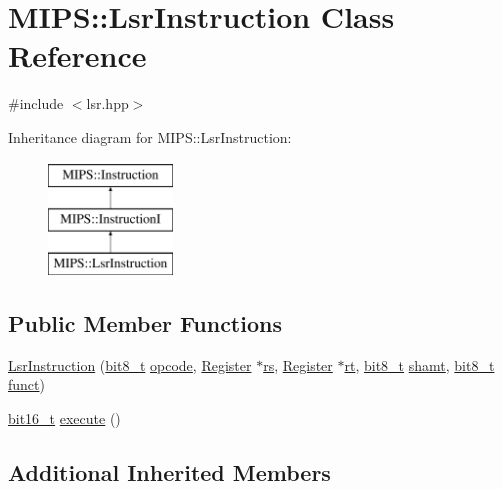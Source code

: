 \hypertarget{classMIPS_1_1LsrInstruction}{}\section{M\+I\+PS\+:\+:Lsr\+Instruction Class Reference}
\label{classMIPS_1_1LsrInstruction}


{\ttfamily \#include $<$lsr.\+hpp$>$}

Inheritance diagram for M\+I\+PS\+:\+:Lsr\+Instruction\+:\begin{figure}[H]
\begin{center}
\leavevmode
\includegraphics[height=3.000000cm]{classMIPS_1_1LsrInstruction}
\end{center}
\end{figure}
\subsection*{Public Member Functions}
\begin{DoxyCompactItemize}
\item 
\hyperlink{classMIPS_1_1LsrInstruction_a20419b31090528cc13610dd7399f511c}{Lsr\+Instruction} (\hyperlink{core_8hpp_a6074bae122ae7b527864eec42c728c3c}{bit8\+\_\+t} \hyperlink{classMIPS_1_1Instruction_a45cc6808b5dde8a5d41067d148b55476}{opcode}, \hyperlink{classMIPS_1_1Register}{Register} $\ast$\hyperlink{classMIPS_1_1InstructionI_a2be191d5b3dce505e2e626ec02eb4d62}{rs}, \hyperlink{classMIPS_1_1Register}{Register} $\ast$\hyperlink{classMIPS_1_1InstructionI_add1db07a5c954f35271de8c8a5737487}{rt}, \hyperlink{core_8hpp_a6074bae122ae7b527864eec42c728c3c}{bit8\+\_\+t} \hyperlink{classMIPS_1_1InstructionI_aa9b6da37c374c2ec8d96448d341e5e7d}{shamt}, \hyperlink{core_8hpp_a6074bae122ae7b527864eec42c728c3c}{bit8\+\_\+t} \hyperlink{classMIPS_1_1InstructionI_a5c6efcbbd233a7447c1fe24ea0a1e558}{funct})
\item 
\hyperlink{core_8hpp_adc265a970bc35995b5879784bbb3f1b7}{bit16\+\_\+t} \hyperlink{classMIPS_1_1LsrInstruction_ae4417a1e7d66faec1361f8884f69c9b2}{execute} ()
\end{DoxyCompactItemize}
\subsection*{Additional Inherited Members}


